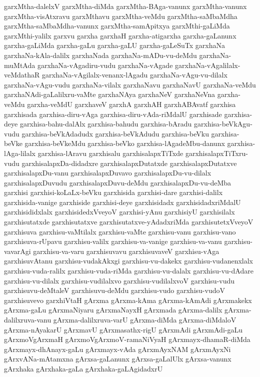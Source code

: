 {garxMtha-dalelxV
garxMtha-diMda
garxMtha-BAga-vanunx
garxMtha-vanunx
garxMtha-visAtxravu
garxMthavu
garxMtha-veMdu
garxMtha-saMbaMdha
garxMtha-saMbaMdha-vanunx
garxMtha-samApitxya
garxMthi-gaLiMda
garxMthi-yalilx
garxvu
garxha
garxhaH
garxha-atigarxha
garxha-gaLanunx
garxha-gaLiMda
garxha-gaLu
garxha-gaLU
garxha-gaLeSuTx
garxhaNa
garxhaNa-kAla-dalilx
garxhaNada
garxhaNa-mADu-vu-deMdu
garxhaNa-muMtAda
garxhaNa-vAgadiru-vudu
garxhaNa-vAgade
garxhaNa-vAgalilalx-veMdathaR
garxhaNa-vAgilalx-venanx-lAgadu
garxhaNa-vAgu-vu-dilalx
garxhaNa-vAgu-vudu
garxhaNa-vilalx
garxhaNavu
garxhaNavU
garxhaNa-veMdu
garxhaNAdi-gaLalilxru-vaMte
garxhaNAya
garxhaNeV
garxhaNeVna
garxha-veMdu
garxha-veMdU
garxhaveV
garxhA
garxhAH
garxhABAvatf
garxhisa
garxhisada
garxhisa-diru-vAga
garxhisa-diru-vAda-riMdalU
garxhisade
garxhisa-deye
garxhisa-bahu-dalAlx
garxhisa-bahudu
garxhisa-bAradu
garxhisa-beVkAgu-vudu
garxhisa-beVkAdadudx
garxhisa-beVkAdudu
garxhisa-beVku
garxhisa-beVke
garxhisa-beVkeMdu
garxhisa-beVko
garxhisa-lAgadeMbu-danunx
garxhisa-lAga-lilalx
garxhisa-lAravu
garxhisalu
garxhisalapxTiTxde
garxhisalapxTiTxru-vudu
garxhisalapxDa-didadxre
garxhisalapxDutatxde
garxhisalapxDutatxve
garxhisalapxDu-vanu
garxhisalapxDuvavo
garxhisalapxDu-vu-dilalx
garxhisalapxDuvudu
garxhisalapxDuvu-deMdu
garxhisalapxDu-vu-deMba
garxhisi
garxhisi-koLaLx-beVku
garxhisida
garxhisi-dare
garxhisi-dalilx
garxhisida-vanige
garxhiside
garxhisi-deye
garxhisidadx
garxhisidadxriMdalU
garxhisididxlalx
garxhisidedxVveyoV
garxhisi-yAnu
garxhisiyU
garxhisilalx
garxhisutatxde
garxhisutatxve
garxhisutatxve-yAdadxriMda
garxhisutetxVveyoV
garxhisuva
garxhisu-vaMtilalx
garxhisu-vaMte
garxhisu-vanu
garxhisu-vano
garxhisuva-rUpavu
garxhisu-valilx
garxhisu-va-vanige
garxhisu-va-vanu
garxhisu-vavarAgi
garxhisu-va-varu
garxhisuvavu
garxhisuvaveV
garxhisu-vAga
garxhisuvAtanu
garxhisu-vudakAkxgi
garxhisu-vu-dakekx
garxhisu-vudanenxlalx
garxhisu-vuda-ralilx
garxhisu-vuda-riMda
garxhisu-vu-dalalx
garxhisu-vu-dAdare
garxhisu-vu-dilalx
garxhisu-vudilalxvo
garxhisu-vudilalxvoV
garxhisu-vudu
garxhisuvu-deMtaleV
garxhisuvu-deMdu
garxhisu-vudo
garxhisu-vudoV
garxhisuvevo
garxhiVtaH
gArxma
gArxma-kAma
gArxma-kAmAdi
gArxmakekx
gArxma-gaLu
gArxmaNiyaru
gArxmaNayxH
gArxmada
gArxma-dalilx
gArxma-dalilxruva-vanu
gArxma-dalilxruva-varU
gArxma-diMda
gArxma-diMdaloV
gArxma-nAyakarU
gArxmavU
gArxmasathx-rigU
gArxmAdi
gArxmAdi-gaLu
gArxmoVgArxmaH
gArxmoVgArxmoV-ramaNiVyaH
gArxmayx-dhamaR-diMda
gArxmayx-dhAnayx-gaLu
gArxmayx-vAda
gArxmAyxNAM
gArxmAyxNi
gArxvANa-mAtamxna
gArxsa-gaLanunx
gArxsa-gaLalUlx
gArxsa-vanunx
gArxhaka
gArxhaka-gaLa
gArxhaka-gaLAgidadxrU
}

